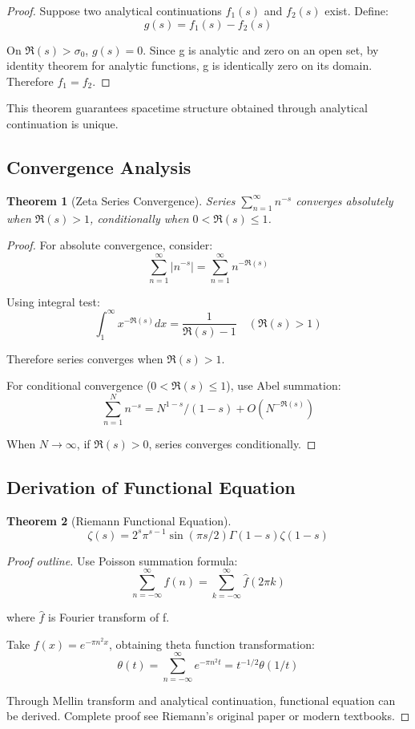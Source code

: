 \documentclass[12pt,a4paper]{article}
\newtheorem{theorem}{Theorem}[section]
\begin{document}
\begin{proof}
Suppose two analytical continuations $f_1(s)$ and $f_2(s)$ exist. Define:
$$g(s) = f_1(s) - f_2(s)$$

On $\Re(s) > \sigma_0$, $g(s) = 0$. Since g is analytic and zero on an open set, by identity theorem for analytic functions, g is identically zero on its domain. Therefore $f_1 = f_2$.
\end{proof}

This theorem guarantees spacetime structure obtained through analytical continuation is unique.

\subsection{Convergence Analysis}

\begin{theorem}[Zeta Series Convergence]
Series $\sum_{n=1}^{\infty} n^{-s}$ converges absolutely when $\Re(s) > 1$, conditionally when $0 < \Re(s) \leq 1$.
\end{theorem}

\begin{proof}
For absolute convergence, consider:
$$\sum_{n=1}^{\infty} |n^{-s}| = \sum_{n=1}^{\infty} n^{-\Re(s)}$$

Using integral test:
$$\int_1^{\infty} x^{-\Re(s)} dx = \frac{1}{\Re(s)-1} \quad (\Re(s) > 1)$$

Therefore series converges when $\Re(s) > 1$.

For conditional convergence ($0 < \Re(s) \leq 1$), use Abel summation:
$$\sum_{n=1}^{N} n^{-s} = N^{1-s}/(1-s) + O(N^{-\Re(s)})$$

When $N \to \infty$, if $\Re(s) > 0$, series converges conditionally.
\end{proof}

\subsection{Derivation of Functional Equation}

\begin{theorem}[Riemann Functional Equation]
$$\zeta(s) = 2^s \pi^{s-1} \sin(\pi s/2) \Gamma(1-s) \zeta(1-s)$$
\end{theorem}

\begin{proof}[Proof outline]
Use Poisson summation formula:
$$\sum_{n=-\infty}^{\infty} f(n) = \sum_{k=-\infty}^{\infty} \hat{f}(2\pi k)$$

where $\hat{f}$ is Fourier transform of f.

Take $f(x) = e^{-\pi n^2 x}$, obtaining theta function transformation:
$$\theta(t) = \sum_{n=-\infty}^{\infty} e^{-\pi n^2 t} = t^{-1/2} \theta(1/t)$$

Through Mellin transform and analytical continuation, functional equation can be derived. Complete proof see Riemann's original paper or modern textbooks.
\end{proof}
\end{document}
